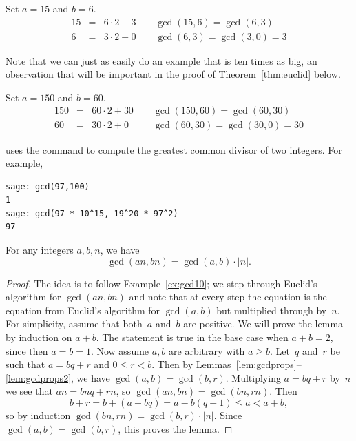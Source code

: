 \begin{example}
Set $a=15$ and $b=6$.
\begin{eqnarray*}
  15 &=& 6\cdot 2 + 3 \qquad\gcd(15,6)=\gcd(6,3)\\
   6 &=& 3\cdot 2 + 0 \qquad\gcd(6,3) =\gcd(3,0)=3
\end{eqnarray*}
\end{example}
\noindent{}Note that
we can just as easily do an example that is ten times
as big, an observation that will be important in the
proof of Theorem~\ref{thm:euclid} below.
\begin{example}\label{ex:gcd10}
Set $a=150$ and $b=60$.
\begin{eqnarray*}
  150 &=& 60\cdot 2 + 30 \qquad\gcd(150,60)=\gcd(60,30)\\
   60 &=& 30\cdot 2 + 0 \qquad\,\,\,\gcd(60,30) =\gcd(30,0)=30
\end{eqnarray*}
\end{example}

\begin{sg}
\sage uses the  command to compute the greatest
common divisor of two integers. For example,
\begin{verbatim}
sage: gcd(97,100)
1
sage: gcd(97 * 10^15, 19^20 * 97^2)
97
\end{verbatim}
\end{sg}

\begin{lemma}\label{lem:gcdmul}
For any integers $a,b,n$, we have
$$\gcd(an,bn) = \gcd(a,b)\cdot |n|.$$
\end{lemma}
\begin{proof}
  The idea is to follow Example~\ref{ex:gcd10}; we step through
  Euclid's algorithm for $\gcd(an,bn)$ and note that at every step the
  equation is the equation from Euclid's algorithm for $\gcd(a,b)$ but
  multiplied through by~$n$.  For simplicity, assume that both~$a$
  and~$b$ are positive.  We will prove the lemma by induction on
  $a+b$. The statement is true in the base case when $a+b=2$,
  since then $a=b=1$.  Now assume $a,b$ are arbitrary with $a\geq b$.
  Let~$q$ and~$r$ be such that $a = bq + r$ and $0\leq r <b$.  Then by
  Lemmas~\ref{lem:gcdprops}--\ref{lem:gcdprops2}, we have $\gcd(a,b) =
  \gcd(b,r)$.  Multiplying $a=bq+r$ by~$n$ we see that $an = bnq +
  rn$, so $\gcd(an,bn) = \gcd(bn,rn)$.  Then
  $$
  b+r  = b + (a-bq)= a-b(q-1) \leq a < a+b,
  $$
  so by induction
  $\gcd(bn,rn) = \gcd(b,r)\cdot |n|$.  Since $\gcd(a,b)=\gcd(b,r)$,
  this proves the lemma.
\end{proof}


